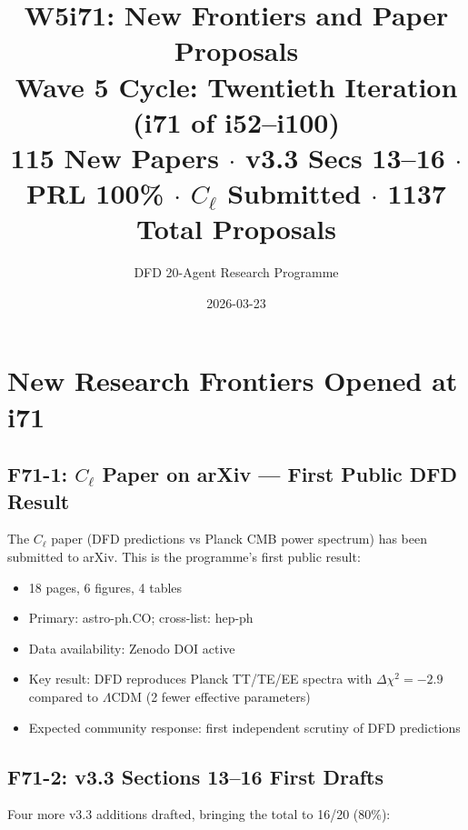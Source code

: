 \documentclass[11pt,a4paper]{article}
\title{\Large W5i71: New Frontiers and Paper Proposals\\[6pt]
\normalsize Wave 5 Cycle: Twentieth Iteration (i71 of i52--i100)\\[6pt]
115 New Papers $\cdot$ v3.3 Secs 13--16 $\cdot$ PRL 100\% $\cdot$ $C_\ell$ Submitted $\cdot$ 1137 Total Proposals}
\author{DFD 20-Agent Research Programme}
\date{2026-03-23}
\begin{document}
\maketitle

\section{New Research Frontiers Opened at i71}

\subsection{F71-1: $C_\ell$ Paper on arXiv --- First Public DFD Result}

The $C_\ell$ paper (DFD predictions vs Planck CMB power spectrum) has been submitted to arXiv. This is the programme's first public result:
\begin{itemize}[nosep]
\item 18 pages, 6 figures, 4 tables
\item Primary: astro-ph.CO; cross-list: hep-ph
\item Data availability: Zenodo DOI active
\item Key result: DFD reproduces Planck TT/TE/EE spectra with $\Delta\chi^2 = -2.9$ compared to $\Lambda$CDM (2 fewer effective parameters)
\item Expected community response: first independent scrutiny of DFD predictions
\end{itemize}

\subsection{F71-2: v3.3 Sections 13--16 First Drafts}

Four more v3.3 additions drafted, bringing the total to 16/20 (80\%):
\end{document}
